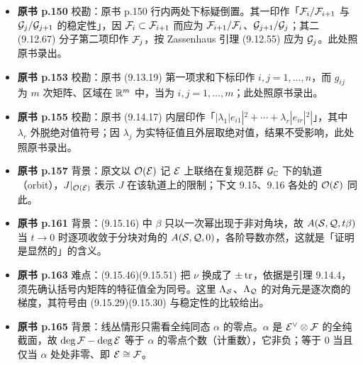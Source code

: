 \begin{itemize}[leftmargin=2.4em,itemsep=4pt,label={\textbullet}]
\item \textbf{原书 p.150} 校勘：原书 p.150 行内两处下标疑倒置。其一印作「$\mathcal{F}_i/\mathcal{F}_{i+1}$ 与 $\mathcal{G}_j/\mathcal{G}_{j+1}$ 的稳定性」，因 $\mathcal{F}_i\subset\mathcal{F}_{i+1}$ 而应为 $\mathcal{F}_{i+1}/\mathcal{F}_i$、$\mathcal{G}_{j+1}/\mathcal{G}_j$；其二 (9.12.67) 分子第二项印作 $\mathcal{F}_j$，按 Zassenhaus 引理 (9.12.55) 应为 $\mathcal{G}_j$。此处照原书录出。
\item \textbf{原书 p.153} 校勘：原书 (9.13.19) 第一项求和下标印作 $i,j=1,\dots,n$，而 $g_{ij}$ 为 $m$ 次矩阵、区域在 $\mathbb{R}^m$ 中，当为 $i,j=1,\dots,m$；此处照原书录出。
\item \textbf{原书 p.155} 校勘：原书 (9.14.17) 内层印作「$|\lambda_1|e_{i1}|^2+\cdots+\lambda_r|e_{ir}|^2|$」，其中 $\lambda_r$ 外脱绝对值符号；因 $\lambda_j$ 为实特征值且外层取绝对值，结果不受影响，此处照原书录出。
\item \textbf{原书 p.157} 背景：原文以 $\mathcal{O}(\mathcal{E})$ 记 $\mathcal{E}$ 上联络在复规范群 $\mathcal{G}_{\mathbb{C}}$ 下的轨道（orbit），$J|_{\mathcal{O}(\mathcal{E})}$ 表示 $J$ 在该轨道上的限制；下文 9.15、9.16 各处的 $\mathcal{O}(\mathcal{E})$ 同此。
\item \textbf{原书 p.161} 背景：(9.15.16) 中 $\beta$ 只以一次幂出现于非对角块，故 $A(\mathcal{S},\mathcal{Q},t\beta)$ 当 $t\to0$ 时逐项收敛于分块对角的 $A(\mathcal{S},\mathcal{Q},0)$，各阶导数亦然，这就是「证明是显然的」的含义。
\item \textbf{原书 p.163} 难点：(9.15.46)(9.15.51) 把 $\nu$ 换成了 $\pm\operatorname{tr}$，依据是引理 9.14.4，须先确认括号内矩阵的特征值全为同号。这里 $\Lambda_{\mathcal{S}}$、$\Lambda_{\mathcal{Q}}$ 的对角元是逐次商的梯度，其符号由 (9.15.29)(9.15.30) 与稳定性的比较给出。
\item \textbf{原书 p.165} 背景：线丛情形只需看全纯同态 $\alpha$ 的零点。$\alpha$ 是 $\mathcal{E}^\vee\otimes\mathcal{F}$ 的全纯截面，故 $\deg\mathcal{F}-\deg\mathcal{E}$ 等于 $\alpha$ 的零点个数（计重数），它非负；等于 $0$ 当且仅当 $\alpha$ 处处非零、即 $\mathcal{E}\cong\mathcal{F}$。
\end{itemize}

